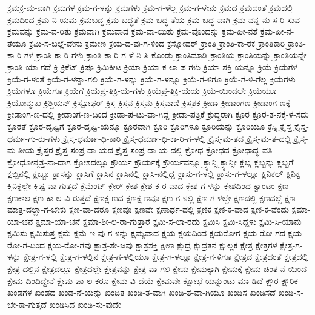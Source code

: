 {ಕ್ರಮಕ್ರ-ಮ-ವಾಗಿ
ಕ್ರಮಗಳ
ಕ್ರಮ-ಗ-ಳನ್ನು
ಕ್ರಮಗಳು
ಕ್ರಮ-ಗ-ಳೆಲ್ಲ
ಕ್ರಮ-ಗ-ಳೇನು
ಕ್ರಮದ
ಕ್ರಮದಂತೆ
ಕ್ರಮದಲ್ಲಿ
ಕ್ರಮದಿಂದ
ಕ್ರಮ-ನಿ-ಯಮ
ಕ್ರಮಬದ್ಧ
ಕ್ರಮ-ಬದ್ಧತೆ
ಕ್ರಮ-ಬದ್ಧ-ತೆಯ
ಕ್ರಮ-ಬದ್ಧ-ವಾಗಿ
ಕ್ರಮ-ವನ್ನ-ನು-ಸ-ರಿ-ಸುವ
ಕ್ರಮವನ್ನು
ಕ್ರಮ-ವ-ರಿತು
ಕ್ರಮವಾಗಿ
ಕ್ರಮವಾದ
ಕ್ರಮ-ವಾ-ಯಿತು
ಕ್ರಮ-ವೊಂದನ್ನು
ಕ್ರಮ-ಹೀ-ನತೆ
ಕ್ರಮ-ಹೀ-ನ-ತೆಯೂ
ಕ್ರಮಿ-ಸ-ಬಲ್ಲೆ-ವೇನು
ಕ್ರಮೇಣ
ಕ್ರಯ-ದ-ವು-ಗ-ಳಿಂದ
ಕ್ರಸ್ನೋದರ್
ಕ್ರಾಂತಿ
ಕ್ರಾಂತಿ-ಕಾ-ರಕ
ಕ್ರಾಂತಿಕಾರಿ
ಕ್ರಾಂತಿ-ಕಾ-ರಿ-ಗಳ
ಕ್ರಾಂತಿ-ಕಾ-ರಿ-ಗಳು
ಕ್ರಾಂತಿ-ಕಾ-ರಿ-ಗ-ಳೆ-ನಿ-ಸಿ-ಕೊಂಡು
ಕ್ರಾಂತಿಮಾಡಿ
ಕ್ರಾಂತಿಯ
ಕ್ರಾಂತಿಯನ್ನು
ಕ್ರಾಂತಿಯನ್ನೇ
ಕ್ರಾಂತಿ-ಯಾ-ಗದೆ
ಕ್ರಿ
ಕ್ರಿಕೆಟ್
ಕ್ರಿಪೂ
ಕ್ರಿಮಿಕೀಟ
ಕ್ರಿಯಾ
ಕ್ರಿಯಾ-ಕ-ಲಾ-ಪ-ಗಳು
ಕ್ರಿಯಾ-ಶಕ್ತಿ-ಯನ್ನೂ
ಕ್ರಿಯೆ
ಕ್ರಿಯೆಗಳ
ಕ್ರಿಯೆ-ಗ-ಳಂತೆ
ಕ್ರಿಯೆ-ಗ-ಳನ್ನಾ-ಗಲಿ
ಕ್ರಿಯೆ-ಗ-ಳನ್ನು
ಕ್ರಿಯೆ-ಗ-ಳನ್ನೂ
ಕ್ರಿಯೆ-ಗ-ಳಿಗೂ
ಕ್ರಿಯೆ-ಗ-ಳಿ-ಗೆಲ್ಲ
ಕ್ರಿಯೆಗಳು
ಕ್ರಿಯೆಗಳೂ
ಕ್ರಿಯೆಗೂ
ಕ್ರಿಯೆಗೆ
ಕ್ರಿಯೆಪ್ರ-ತಿಕ್ರಿ-ಯೆ-ಗಳು
ಕ್ರಿಯೆಪ್ರ-ತಿಕ್ರಿ-ಯೆಯ
ಕ್ರಿಯೆ-ಯಿಂದಲೇ
ಕ್ರಿಯೆಯೂ
ಕ್ರಿಯೋನ್ಮುಖ
ಕ್ರಿಶ್ಚಿಯನ್
ಕ್ರಿಸ್ಟೋಫರ್
ಕ್ರಿಸ್ತ
ಕ್ರಿಸ್ತನ
ಕ್ರಿಸ್ತನು
ಕ್ರಿಸ್ತವಾಣಿ
ಕ್ರಿಸ್ತಶಕ
ಕ್ರೀಡಾ
ಕ್ರೀಡಾಂಗಣ
ಕ್ರೀಡಾಂಗ-ಣಕ್ಕೆ
ಕ್ರೀಡಾಂಗ-ಣ-ದಲ್ಲಿ
ಕ್ರೀಡಾಂಗ-ಣ-ದಿಂದ
ಕ್ರೀಡಾ-ಪ-ಟು-ವಾ-ಗಿದ್ದ
ಕ್ರೀಡಾ-ಪತ್ರಿಕೆ
ಕ್ರುದ್ಧರಾಗಿ
ಕ್ರೂರ
ಕ್ರೂರ-ತ-ನಕ್ಕೆ-ಳ-ಸದು
ಕ್ರೂರತೆ
ಕ್ರೂರ-ದೃಷ್ಟಿಗೆ
ಕ್ರೂರ-ದೃಷ್ಟಿ-ಯನ್ನೂ
ಕ್ರೂರವಾಗಿ
ಕ್ರೂರಿ
ಕ್ರೂರಿಗಳೂ
ಕ್ರೂರಿಯನ್ನು
ಕ್ರೂರಿಯೂ
ಕ್ರೆಸ್ಸಿ
ಕ್ರೈಸ್ತ
ಕ್ರೈಸ್ತ-ಧರ್ಮ-ಗು-ರು-ಗಳು
ಕ್ರೈಸ್ತ-ಧರ್ಮಾ-ಧಿ-ಕಾರಿ
ಕ್ರೈಸ್ತ-ಧರ್ಮಾ-ಧಿ-ಕಾ-ರಿ-ಗ-ಳಲ್ಲಿ
ಕ್ರೈಸ್ತ-ಮ-ತದ
ಕ್ರೈಸ್ತ-ಮ-ತ-ದಲ್ಲಿ
ಕ್ರೈಸ್ತ-ಮ-ತೀಯ
ಕ್ರೈಸ್ತರ
ಕ್ರೈಸ್ತ-ಸಂಪ್ರ-ದಾ-ಯದ
ಕ್ರೈಸ್ತ-ಸಂಪ್ರ-ದಾ-ಯ-ದಲ್ಲಿ
ಕ್ರೋಧ
ಕ್ರೋಧದ
ಕ್ರೋಧಾದ್ಭ-ವತಿ
ಕ್ರೋಧೋನ್ಮತ್ತ-ನಾ-ದಾಗ
ಕ್ರೋಶದಲ್ಲೂ
ಕ್ರೌರ್ಯ
ಕ್ರೌರ್ಯಕ್ಕೆ
ಕ್ರೌರ್ಯವನ್ನೂ
ಕ್ರ್ಯಾನ್ಸಿ
ಕ್ರ್ಯಾನ್ಸೀ
ಕ್ಲಬ್ನ
ಕ್ಲಬ್ಬನ್ನು
ಕ್ಲಬ್ಬಿಗೆ
ಕ್ಲಬ್ಬಿನಲ್ಲಿ
ಕ್ಲಬ್ಬೂ
ಕ್ಲಾಸನ್ನು
ಕ್ಲಾಸಿಗೆ
ಕ್ಲಾಸಿನ
ಕ್ಲಾಸಿನಲ್ಲಿ
ಕ್ಲಾಸಿ-ನಲ್ಲಿದ್ದ
ಕ್ಲಾಸು-ಗ-ಳಲ್ಲಿ
ಕ್ಲಾಸು-ಗ-ಳಲ್ಲೂ
ಕ್ಲಿನಿಕಲ್
ಕ್ಲಿನಿಕ್ನ
ಕ್ಲಿನಿಕ್ನಲ್ಲೇ
ಕ್ಲಿಷ್ಟ-ವಾ-ಗುತ್ತದೆ
ಕ್ಲೆಮೆಂಟ್
ಕ್ಲೇರ್
ಕ್ಲೇಶ
ಕ್ಲೇಶ-ಕ-ರ-ವಾದ
ಕ್ಲೇಶ-ಗ-ಳನ್ನು
ಕ್ಲೇಶದಿಂದ
ಕ್ವಾಂಟಂ
ಕ್ಷಣ
ಕ್ಷಣಕಾಲ
ಕ್ಷಣ-ಕಾ-ಲ-ವಿ-ರುತ್ತದೆ
ಕ್ಷಣಕ್ಷ-ಣದ
ಕ್ಷಣಕ್ಷ-ಣವೂ
ಕ್ಷಣ-ಗ-ಳಲ್ಲಿ
ಕ್ಷಣ-ಗ-ಳಲ್ಲೇ
ಕ್ಷಣದಲ್ಲಿ
ಕ್ಷಣದಲ್ಲೆ
ಕ್ಷಣ-ಮಾತ್ರ-ದಲ್ಲಾ-ಗ-ಬೇಕು
ಕ್ಷಣ-ವಾ-ದರೂ
ಕ್ಷಣವೂ
ಕ್ಷಣವೇ
ಕ್ಷಣಾರ್ಧ-ದಲ್ಲಿ
ಕ್ಷಣಿಕ
ಕ್ಷಣಿ-ಕ-ವಾದ
ಕ್ಷಣಿ-ಕ-ವೆಂದು
ಕ್ಷಮಾ-ಯಾ-ಚನೆ
ಕ್ಷಮಾ-ಯಾ-ಚನೆ
ಕ್ಷಮಾ-ಶೀ-ಲ-ರಾ-ಗುತ್ತಾರೆ
ಕ್ಷಮಿ-ಸ-ಲಾ-ರದು
ಕ್ಷಮಿಸಿ
ಕ್ಷಮಿ-ಸಿದ್ದಳು
ಕ್ಷಮಿ-ಸಿ-ಯಾನು
ಕ್ಷಮಿಸು
ಕ್ಷಮಿಸುತ್ತ
ಕ್ಷಮೆ
ಕ್ಷಮೆ-ಇ-ವು-ಗ-ಳನ್ನು
ಕ್ಷಮ್ಯವಾದ
ಕ್ಷಯ
ಕ್ಷಯದಿಂದ
ಕ್ಷಯರೋಗ
ಕ್ಷಯ-ರೋ-ಗದ
ಕ್ಷಯ-ರೋ-ಗ-ದಿಂದ
ಕ್ಷಯ-ರೋ-ಗವು
ಕ್ಷಾತ್ರ-ತೇ-ಜವು
ಕ್ಷಾತ್ರಶಕ್ತಿ
ಕ್ಷೀಣ
ಕ್ಷುದ್ರ
ಕ್ಷುದ್ರತನ
ಕ್ಷುಲ್ಲಕ
ಕ್ಷೇತ್ರ
ಕ್ಷೇತ್ರಗಳ
ಕ್ಷೇತ್ರ-ಗ-ಳನ್ನು
ಕ್ಷೇತ್ರ-ಗ-ಳಲ್ಲಿ
ಕ್ಷೇತ್ರ-ಗ-ಳಲ್ಲಿನ
ಕ್ಷೇತ್ರ-ಗ-ಳಲ್ಲಿಯೂ
ಕ್ಷೇತ್ರ-ಗ-ಳಲ್ಲೂ
ಕ್ಷೇತ್ರ-ಗ-ಳಿಗೂ
ಕ್ಷೇತ್ರದ
ಕ್ಷೇತ್ರದಂತೆ
ಕ್ಷೇತ್ರದಲ್ಲಿ
ಕ್ಷೇತ್ರ-ದಲ್ಲಿನ
ಕ್ಷೇತ್ರದಲ್ಲೂ
ಕ್ಷೇತ್ರದಲ್ಲೇ
ಕ್ಷೇತ್ರವನ್ನು
ಕ್ಷೇತ್ರ-ವಾ-ಗಲಿ
ಕ್ಷೇಮ
ಕ್ಷೇಮಕ್ಕಾಗಿ
ಕ್ಷೇಮಕ್ಕೆ
ಕ್ಷೇಮ-ಚಿಂತ-ನೆ-ಯಿಂದ
ಕ್ಷೇಮ-ದಿಂದಿದ್ದೇನೆ
ಕ್ಷೇಮ-ಪಾ-ಲ-ಕರೂ
ಕ್ಷೇಮ-ವಿ-ದೆಯೆ
ಕ್ಷೇಮವೇ
ಕ್ಷೋಭೆ-ಯನ್ನುಂಟು-ಮಾ-ಡಿದೆ
ಕ್ಷೌರ
ಕ್ಷೌರಿಕ
ಖಂಡಗಳ
ಖಂಡದ
ಖಂಡ-ನೆ-ಯನ್ನು
ಖಂಡಿತ
ಖಂಡಿ-ತ-ವಾಗಿ
ಖಂಡಿ-ತ-ವಾ-ಗಿಯೂ
ಖಂಡಿಸ
ಖಂಡಿಸದೆ
ಖಂಡಿ-ಸ-ಬೇ-ಕಾ-ಗುತ್ತದೆ
ಖಂಡಿಸಿದ
ಖಂಡಿ-ಸು-ವುದೇ
}
